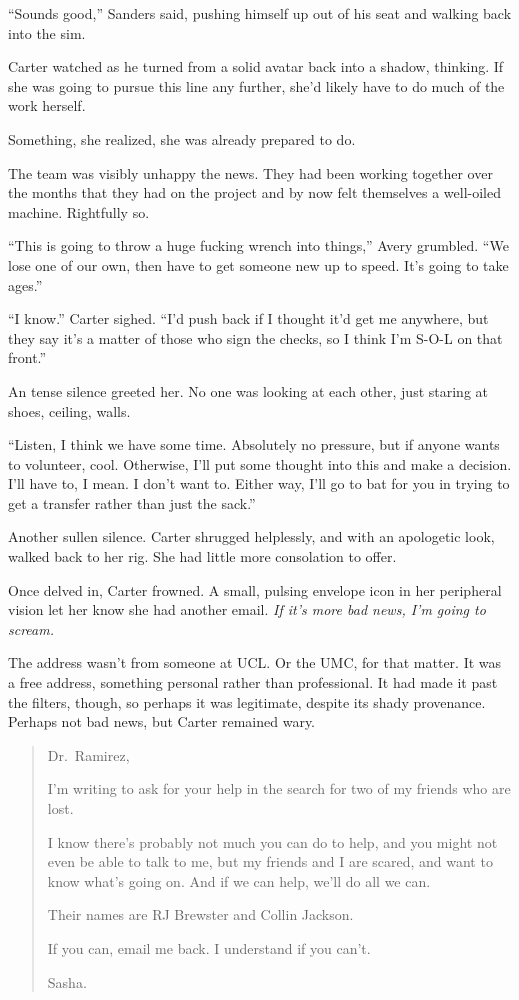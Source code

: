 ``Sounds good,'' Sanders said, pushing himself up out of his seat and walking back into the sim.

Carter watched as he turned from a solid avatar back into a shadow, thinking. If she was going to pursue this line any further, she'd likely have to do much of the work herself.

Something, she realized, she was already prepared to do.

The team was visibly unhappy the news. They had been working together over the months that they had on the project and by now felt themselves a well-oiled machine. Rightfully so.

``This is going to throw a huge fucking wrench into things,'' Avery grumbled. ``We lose one of our own, then have to get someone new up to speed. It's going to take ages.''

``I know.'' Carter sighed. ``I'd push back if I thought it'd get me anywhere, but they say it's a matter of those who sign the checks, so I think I'm S-O-L on that front.''

An tense silence greeted her. No one was looking at each other, just staring at shoes, ceiling, walls.

``Listen, I think we have some time. Absolutely no pressure, but if anyone wants to volunteer, cool. Otherwise, I'll put some thought into this and make a decision. I'll have to, I mean. I don't want to. Either way, I'll go to bat for you in trying to get a transfer rather than just the sack.''

Another sullen silence. Carter shrugged helplessly, and with an apologetic look, walked back to her rig. She had little more consolation to offer.

Once delved in, Carter frowned. A small, pulsing envelope icon in her peripheral vision let her know she had another email. \emph{If it's more bad news, I'm going to scream.}

The address wasn't from someone at UCL. Or the UMC, for that matter. It was a free address, something personal rather than professional. It had made it past the filters, though, so perhaps it was legitimate, despite its shady provenance. Perhaps not bad news, but Carter remained wary.

\begin{quote}
Dr.~Ramirez,

I'm writing to ask for your help in the search for two of my friends who are lost.

I know there's probably not much you can do to help, and you might not even be able to talk to me, but my friends and I are scared, and want to know what's going on. And if we can help, we'll do all we can.

Their names are RJ Brewster and Collin Jackson.

If you can, email me back. I understand if you can't.

Sasha.
\end{quote}

